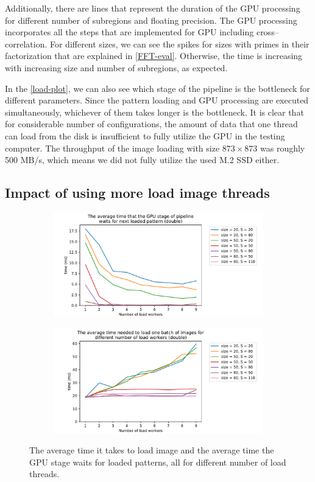 Additionally, there are lines that represent the duration of the GPU processing for different number of subregions and floating precision. The GPU processing incorporates all the steps that are implemented for GPU including cross--correlation. For different sizes, we can see the spikes for sizes with primes in their factorization that are explained in \cref{FFT-eval}. Otherwise, the time is increasing with increasing size and number of subregions, as expected.

In the \cref{load-plot}, we can also see which stage of the pipeline is the bottleneck for different parameters. Since the pattern loading and GPU processing are executed simultaneously, whichever of them takes longer is the bottleneck. It is clear that for considerable number of configurations, the amount of data that one thread can load from the disk is insufficient to fully utilize the GPU in the testing computer. The throughput of the image loading with size $873\times873$ was roughly 500 MB/s, which means we did not fully utilize the used M.2 SSD either.

\subsection{Impact of using more load image threads}
\label{load-eval-lw}

\begin{figure}
	\centering
	\begin{subfigure}{\textwidth}
		\centering
		\includegraphics[width=0.75\linewidth]{img/eval/loadworkers-offset-wait}
		\caption{}
		\label{loadworkers-offset-wait}
	\end{subfigure}
	
	\begin{subfigure}{\textwidth}
		\centering
		\includegraphics[width=0.75\linewidth]{img/eval/loadworkers-load-tiff}
		\caption{}
		\label{loadworkers-load-tiff}
	\end{subfigure}


	\caption{The average time it takes to load image and the average time the GPU stage waits for loaded patterns, all for different number of load threads.}
	\label{loadworkers}
\end{figure}

